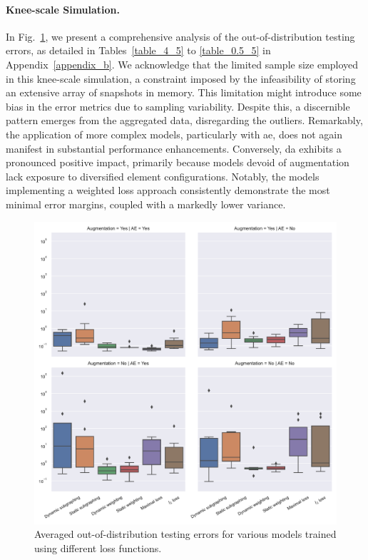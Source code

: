 \paragraph{Knee-scale Simulation.} In Fig.~\ref{fig:3d_boxplot}, we present a comprehensive analysis of the out-of-distribution testing errors, as detailed in Tables~\ref{table_4_5} to \ref{table_0.5_5} in Appendix~\ref{appendix_b}. We acknowledge that the limited sample size employed in this knee-scale simulation, a constraint imposed by the infeasibility of storing an extensive array of snapshots in memory. This limitation might introduce some bias in the error metrics due to sampling variability. Despite this, a discernible pattern emerges from the aggregated data, disregarding the outliers. Remarkably, the application of more complex models, particularly with \ac{ae}, does not again manifest in substantial performance enhancements. Conversely, \ac{da} exhibits a pronounced positive impact, primarily because models devoid of augmentation lack exposure to diversified element configurations. Notably, the models implementing a weighted loss approach consistently demonstrate the most minimal error margins, coupled with a markedly lower variance.
%
\begin{figure}\centering
\includegraphics[width=1\linewidth,keepaspectratio]{3d_boxplot.pdf}
\caption{Averaged out-of-distribution testing errors for various models trained using different loss functions.}\label{fig:3d_boxplot}
\end{figure}

